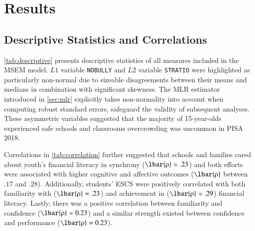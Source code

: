 \chapter{Results}
\label{chp:4}



\section{Descriptive Statistics and Correlations}

\cref{tab:descriptive} presents descriptive statistics of all measures included in the MSEM model. $L1$ variable \texttt{NOBULLY} and $L2$ variable \texttt{STRATIO} were highlighted as particularly non-normal due to sizeable disagreements between their means and medians in combination with significant skewness. The MLR estimator introduced in \cref{sec:mlr} explicitly takes non-normality into account when computing robust standard errors, safeguard the validity of subsequent analyses. These asymmetric variables suggested that the majority of 15-year-olds experienced safe schools and classrooms overcrowding was uncommon in PISA 2018.

Correlations in \cref{tab:correlation} further suggested that schools and families cared about youth's financial literacy in synchrony ($\lbar{\rho} \approx .23$) and both efforts were associated with higher cognitive and affective outcomes ($\lbar{\rho}$ between $.17$ and $.28$). Additionally, students' ESCS were positively correlated with both familiarity with ($\lbar{\rho} = .23$) and achievement in ($\lbar{\rho} \approx .29$) financial literacy. Lastly, there was a positive correlation between familiarity and confidence ($\lbar{\rho} \approx 0.23$) and a similar strength existed between confidence and performance ($\lbar{\rho} = 0.23$).

